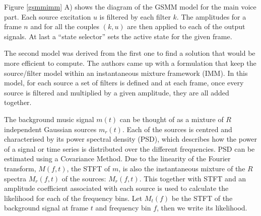 Figure \ref{gsmmimm}  A) shows the diagram of the GSMM model for the main voice part. Each source excitation $u$ is filtered by each filter $k$. The amplitudes for a frame $n$ and for all the couples $(k, u)$ are then applied to each of the output signals. At last a “state selector” sets the active state for the given frame.

The second model was derived from the first one to find a solution that would be more efficient to compute. The authors came up with a formulation that keep the source/filter model within an instantaneous mixture framework (IMM). In this model, for each source a set of filters is defined and at each frame, once every source is filtered and multiplied by a given amplitude, they are all added together.

The background music signal $m(t)$ can be thought of as a mixture of $R$ independent Gaussian sources $m_{r}(t)$. 
Each of the sources is centred and characterised by its power spectral density (PSD), which describes how the power of a signal or time series is distributed over the different frequencies. PSD can be estimated using a Covariance Method.
Due to the linearity of the Fourier transform, $M(f,t)$, the STFT of $m$, is also the instantaneous mixture of the $R$ spectra $M_{r}(f,t)$ of the sources: $M_{r}(f,t)$.
This together with STFT and an amplitude coefficient associated with each source is used to calculate the likelihood for each of the frequency bins. Let $M_{t}(f)$ be the STFT of the background signal at frame $t$ and frequency bin $f$, then we write its likelihood.

